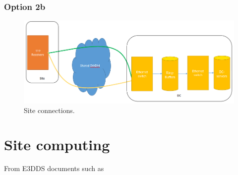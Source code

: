 \documentclass[12pt,a4paper]{article}
\begin{document}
\subsubsection{Option 2b}
\label{sssec:option2b}
\begin{figure}[h]
\centering
\includegraphics[width=\textwidth]{photon_option_2b.png}
\caption{Site connections.\label{fig:option_2b}
}
\end{figure}

\section{Site computing}
\label{sec:site-comp}

From E3DDS documents such as~\cite{}
\newpage
{}

\end{document}
